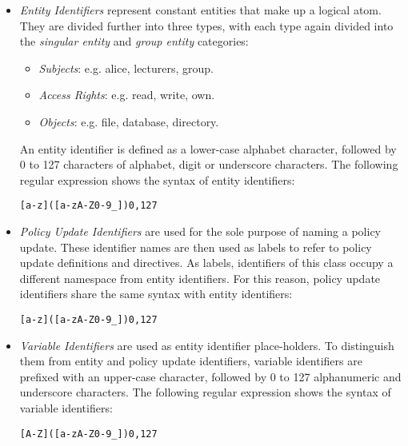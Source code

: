 \documentclass[11pt, twocolumn]{article}
\newenvironment{vverbose}
  {\begin{alltt}}
  {\vspace{-\baselineskip}\end{alltt}}
\begin{document}
          \begin{itemize}
            \item
              {\em Entity Identifiers} represent constant entities that make up
              a logical atom. They are divided further into three types, with
              each type again divided into the {\em singular entity} and
              {\em group entity} categories:

              \begin{itemize}
                \item
                  {\em Subjects}: e.g. alice, lecturers, group.
                \item
                  {\em Access Rights}: e.g. read, write, own.
                \item
                  {\em Objects}: e.g. file, database, directory.
              \end{itemize}

              An entity identifier is defined as a lower-case alphabet
              character, followed by 0 to 127 characters of alphabet, digit or
              underscore characters. The following regular expression shows the
              syntax of entity identifiers:

              \begin{vverbose}
[a-z]([a-zA-Z0-9\_]){0,127}
              \end{vverbose}

            \item
              {\em Policy Update Identifiers} are used for the sole purpose of
              naming a policy update. These identifier names are then used as
              labels to refer to policy update definitions and directives. As
              labels, identifiers of this class occupy a different namespace
              from entity identifiers. For this reason, policy update
              identifiers share the same syntax with entity identifiers:


              \begin{vverbose}
[a-z]([a-zA-Z0-9\_]){0,127}
              \end{vverbose}

            \item
              {\em Variable Identifiers} are used as entity identifier
              place-holders. To distinguish them from entity and policy update
              identifiers, variable identifiers are prefixed with an upper-case
              character, followed by 0 to 127 alphanumeric and underscore
              characters. The following regular expression shows the syntax of
              variable identifiers:

              \begin{vverbose}
[A-Z]([a-zA-Z0-9\_]){0,127}
              \end{vverbose}
          \end{itemize}
\end{document}
